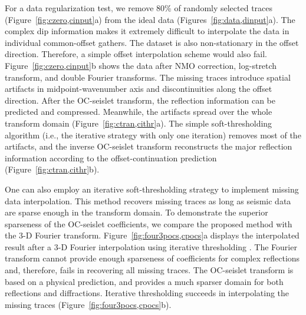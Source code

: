 For a data regularization test, we remove 80\% of randomly selected
traces (Figure~\ref{fig:czero,cinput}a) from the ideal data
(Figures~\ref{fig:data,dinput}a). The complex dip information makes it
extremely difficult to interpolate the data in individual
common-offset gathers. The dataset is also non-stationary in the
offset direction. Therefore, a simple offset interpolation scheme
would also fail. Figure~\ref{fig:czero,cinput}b shows the data after
NMO correction, log-stretch transform, and double Fourier
transforms. The missing traces introduce spatial artifacts in
midpoint-wavenumber axis and discontinuities along the offset
direction. After the OC-seislet transform, the reflection information
can be predicted and compressed. Meanwhile, the artifacts spread over
the whole transform domain (Figure~\ref{fig:ctran,cithr}a). The simple
soft-thresholding algorithm (i.e., the iterative strategy with
only one iteration) removes most of the artifacts, and the inverse
OC-seislet transform reconstructs the major reflection
information according to the offset-continuation prediction
(Figure~\ref{fig:ctran,cithr}b).




One can also employ an iterative soft-thresholding strategy to
implement missing data interpolation. This method recovers missing
traces as long as seismic data are sparse enough in the transform
domain. To demonstrate the superior sparseness of the OC-seislet
coefficients, we compare the proposed method with the 3-D Fourier
transform. Figure~\ref{fig:four3pocs,cpocs}a displays the interpolated
result after a 3-D Fourier interpolation using iterative thresholding
\cite[]{Abma06}. The Fourier transform cannot provide enough
sparseness of coefficients for complex reflections and, therefore,
fails in recovering all missing traces. The OC-seislet transform is
based on a physical prediction, and provides a much sparser domain for
both reflections and diffractions. Iterative thresholding succeeds in
interpolating the missing traces (Figure~\ref{fig:four3pocs,cpocs}b).

